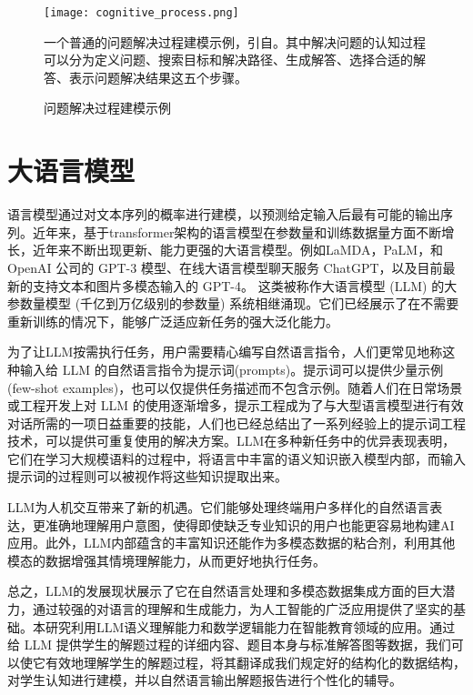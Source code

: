 \begin{figure}
    \centering
    \texttt{[image: cognitive\_process.png]}
    \caption*{一个普通的问题解决过程建模示例，引自\citet{wang2010cognitive}。其中解决问题的认知过程可以分为定义问题、搜索目标和解决路径、生成解答、选择合适的解答、表示问题解决结果这五个步骤。}
    \caption{问题解决过程建模示例}
    \label{fig:cognitive_process}
\end{figure}

\section{大语言模型}

语言模型通过对文本序列的概率进行建模，以预测给定输入后最有可能的输出序列。近年来，基于transformer架构\cite{vaswani2017attention}的语言模型在参数量和训练数据量方面不断增长，近年来不断出现更新、能力更强的大语言模型。例如LaMDA\cite{thoppilan2022lamda}，PaLM\cite{anil2023palm}，和 OpenAI 公司的 GPT-3 模型\cite{brown2020language}、在线大语言模型聊天服务 ChatGPT\cite{abdullah2022chatgpt}，以及目前最新的支持文本和图片多模态输入的 GPT-4\cite{achiam2023gpt}。 这类被称作大语言模型 (LLM) 的大参数量模型 (千亿到万亿级别的参数量) 系统相继涌现。它们已经展示了在不需要重新训练的情况下，能够广泛适应新任务的强大泛化能力。

为了让LLM按需执行任务，用户需要精心编写自然语言指令，人们更常见地称这种输入给 LLM 的自然语言指令为提示词(prompts)。提示词可以提供少量示例(few-shot examples)，也可以仅提供任务描述而不包含示例。随着人们在日常场景或工程开发上对 LLM 的使用逐渐增多，提示工程成为了与大型语言模型进行有效对话所需的一项日益重要的技能，人们也已经总结出了一系列经验上的提示词工程技术，可以提供可重复使用的解决方案\cite{white2023prompt}。LLM在多种新任务中的优异表现表明，它们在学习大规模语料的过程中，将语言中丰富的语义知识嵌入模型内部，而输入提示词的过程则可以被视作将这些知识提取出来。

LLM为人机交互带来了新的机遇\cite{bommasani2021opportunities}。它们能够处理终端用户多样化的自然语言表达，更准确地理解用户意图，使得即使缺乏专业知识的用户也能更容易地构建AI应用。此外，LLM内部蕴含的丰富知识还能作为多模态数据的粘合剂，利用其他模态的数据增强其情境理解能力，从而更好地执行任务。

总之，LLM的发展现状展示了它在自然语言处理和多模态数据集成方面的巨大潜力，通过较强的对语言的理解和生成能力，为人工智能的广泛应用提供了坚实的基础。本研究利用LLM语义理解能力和数学逻辑能力在智能教育领域的应用。通过给 LLM 提供学生的解题过程的详细内容、题目本身与标准解答图等数据，我们可以使它有效地理解学生的解题过程，将其翻译成我们规定好的结构化的数据结构，对学生认知进行建模，并以自然语言输出解题报告进行个性化的辅导。

